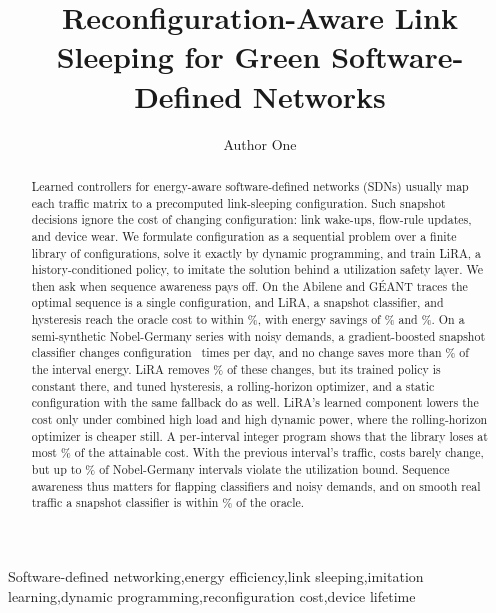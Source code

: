 \documentclass[preprint,12pt]{elsarticle}
\begin{document}
\begin{frontmatter}
\title{Reconfiguration-Aware Link Sleeping for Green Software-Defined Networks}

\author[a]{Author One}

\begin{abstract}
Learned controllers for energy-aware software-defined networks (SDNs) usually map each traffic matrix to a precomputed link-sleeping configuration. Such snapshot decisions ignore the cost of changing configuration: link wake-ups, flow-rule updates, and device wear. We formulate configuration as a sequential problem over a finite library of configurations, solve it exactly by dynamic programming, and train LiRA, a history-conditioned policy, to imitate the solution behind a utilization safety layer. We then ask when sequence awareness pays off. On the Abilene and G\'{E}ANT traces the optimal sequence is a single configuration, and LiRA, a snapshot classifier, and hysteresis reach the oracle cost to within \realSpread\%, with energy savings of \abiSav\% and \geaSav\%. On a semi-synthetic Nobel-Germany series with noisy demands, a gradient-boosted snapshot classifier changes configuration \nobBFourchg\ times per day, and no change saves more than \gainMax\% of the interval energy. LiRA removes \nobY\% of these changes, but its trained policy is constant there, and tuned hysteresis, a rolling-horizon optimizer, and a static configuration with the same fallback do as well. LiRA's learned component lowers the cost only under combined high load and high dynamic power, where the rolling-horizon optimizer is cheaper still. A per-interval integer program shows that the library loses at most \boundMaxLoss\% of the attainable cost. With the previous interval's traffic, costs barely change, but up to \staleNobViolMax\% of Nobel-Germany intervals violate the utilization bound. Sequence awareness thus matters for flapping classifiers and noisy demands, and on smooth real traffic a snapshot classifier is within \bfourAbiGap\% of the oracle.
\end{abstract}

\begin{keyword}
Software-defined networking\sep energy efficiency\sep link sleeping\sep imitation learning\sep dynamic programming\sep reconfiguration cost\sep device lifetime
\end{keyword}
\end{frontmatter}
\end{document}
